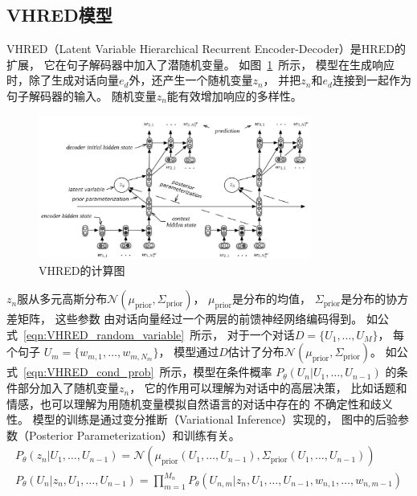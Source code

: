 \subsection{VHRED模型}\label{subsec:VHRED}
VHRED（Latent Variable Hierarchical Recurrent Encoder-Decoder）是HRED的扩展，
它在句子解码器中加入了潜随机变量。
如图~\ref{fig:VHRED}~所示，
模型在生成响应时，除了生成对话向量$e_d$外，还产生一个随机变量$z_n$，
并把$z_n$和$e_d$连接到一起作为句子解码器的输入。
随机变量$z_n$能有效增加响应的多样性。
\begin{figure}[H]
    \centering
    \includegraphics[width=0.8\textwidth]{figure/VHRED.png}
    \caption{VHRED的计算图}
    \label{fig:VHRED}
\end{figure}

$z_n$服从多元高斯分布$\mathcal{N}(\mu_{\text{prior}},
\Sigma_{\text{prior}})$，
$\mu_{\text{prior}}$是分布的均值，
$\Sigma_{\text{prior}}$是分布的协方差矩阵，
这些参数
由对话向量经过一个两层的前馈神经网络编码得到。
如公式~\ref{eqn:VHRED_random_variable}~所示，
对于一个对话$D = \{ U_1, \dots, U_M \}$，
每个句子
$U_m = \{ w_{m, 1}, \dots, w_{m, N_m} \}$，
模型通过$D$估计了分布$\mathcal{N}(\mu_{\text{prior}},
\Sigma_{\text{prior}})$。
如公式~\ref{eqn:VHRED_cond_prob}~所示，模型在条件概率
$P_{\theta}(U_n|U_1, \dots, U_{n-1})$
的条件部分加入了随机变量$z_n$，
它的作用可以理解为对话中的高层决策，
比如话题和情感，也可以理解为用随机变量模拟自然语言的对话中存在的
不确定性和歧义性。
模型的训练是通过变分推断（Variational Inference）实现的，
图中的后验参数（Posterior Parameterization）和训练有关。
\begin{align}
    P_{\theta}(z_n|{U}_1, \dots, U_{n-1}) = \mathcal{N}(\mu_{\text{prior}}(U_1, \dots, U_{n-1}), \Sigma_{\text{prior}}(U_1, \dots, U_{n-1}))
    \label{eqn:VHRED_random_variable} \\
    P_{\theta}(U_n|z_n, U_1, \dots, U_{n-1}) = \prod_{m=1}^{M_n}P_{\theta}(U_{n, m}|z_n, U_1, \dots, U_{n-1}, w_{n, 1}, \dots, w_{n, m-1})
    \label{eqn:VHRED_cond_prob}
\end{align}


